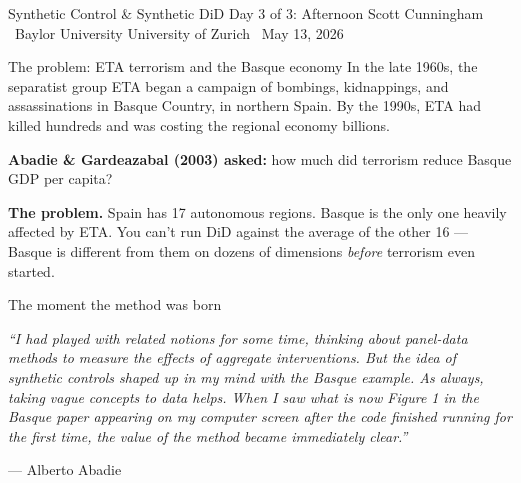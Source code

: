 \documentclass[aspectratio=169,11pt]{beamer}
\begin{document}

\remixtitleframe
  {Synthetic Control \& Synthetic DiD}
  {Day 3 of 3: Afternoon}
  {Scott Cunningham \textperiodcentered\ Baylor University}
  {University of Zurich \textperiodcentered\ May 13, 2026}

\begin{frame}{The problem: ETA terrorism and the Basque economy}
\vspace{0.4em}
In the late 1960s, the separatist group ETA began a campaign of bombings, kidnappings, and assassinations in Basque Country, in northern Spain. By the 1990s, ETA had killed hundreds and was costing the regional economy billions.

\vspace{0.6em}
\textbf{Abadie \& Gardeazabal (2003) asked:} \;how much did terrorism reduce Basque GDP per capita?

\vspace{0.6em}
\textbf{The problem.} \;Spain has 17 autonomous regions. Basque is the only one heavily affected by ETA. You can't run DiD against the average of the other 16 --- Basque is different from them on dozens of dimensions \textit{before} terrorism even started.

\vspace{0.4em}
\end{frame}

\begin{frame}{The moment the method was born}
\vspace{0.7em}
\begin{center}\itshape\small
``I had played with related notions for some time, thinking about panel-data methods to measure the effects of aggregate interventions. \;But the idea of synthetic controls shaped up in my mind with the Basque example. \;As always, taking vague concepts to data helps. \; \;When I saw what is now Figure 1 in the Basque paper appearing on my computer screen after the code finished running for the first time, the value of the method became immediately clear.''
\end{center}

\vspace{0.6em}
\hfill \small --- Alberto Abadie

\vspace{0.6em}
\end{frame}
\end{document}
